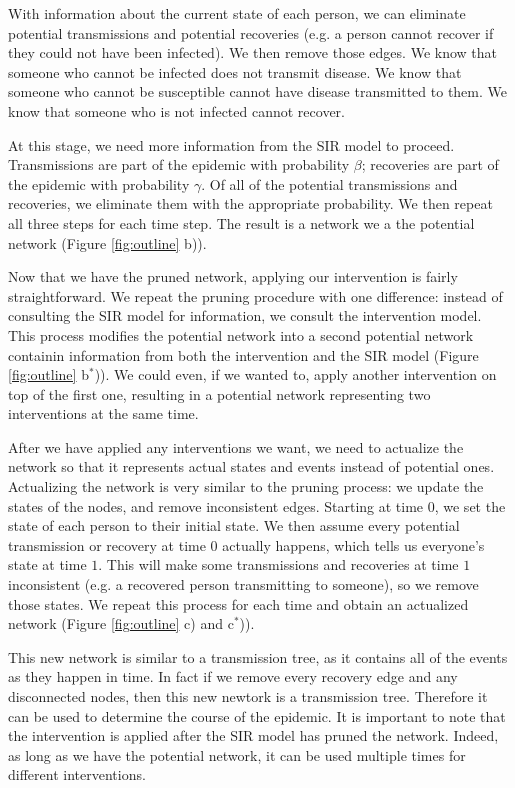 \documentclass[PTRSB]{rsos}
\begin{document}
\begin{multicols}{2}
With information about the current state of each person, we can eliminate potential transmissions and potential recoveries (e.g. a person cannot recover if they could not have been infected).
We then remove those edges.
We know that someone who cannot be infected does not transmit disease.
We know that someone who cannot be susceptible cannot have disease transmitted to them.
We know that someone who is not infected cannot recover.

At this stage, we need more information from the SIR model to proceed.
Transmissions are part of the epidemic with probability $\beta$; recoveries are part of the epidemic with probability $\gamma$.
Of all of the potential transmissions and recoveries, we eliminate them with the appropriate probability.
We then repeat all three steps for each time step.
The result is a network we a the potential network (Figure \ref{fig:outline} b)).

Now that we have the pruned network, applying our intervention is fairly straightforward.
We repeat the pruning procedure with one difference: instead of consulting the SIR model for information, we consult the intervention model.
This process modifies the potential network into a second potential network containin information from both the intervention and the SIR model (Figure \ref{fig:outline} b${}^*$)).
We could even, if we wanted to, apply another intervention on top of the first one, resulting in a potential network representing two interventions at the same time.

After we have applied any interventions we want, we need to actualize the network so that it represents actual states and events instead of potential ones.
Actualizing the network is very similar to the pruning process: we update the states of the nodes, and remove inconsistent edges.
Starting at time $0$, we set the state of each person to their initial state.
We then assume every potential transmission or recovery at time $0$ actually happens, which tells us everyone's state at time $1$.
This will make some transmissions and recoveries at time $1$ inconsistent (e.g. a recovered person transmitting to someone), so we remove those states.
We repeat this process for each time and obtain an actualized network (Figure \ref{fig:outline} c) and c${}^*$)).

This new network is similar to a transmission tree, as it contains all of the events as they happen in time.
In fact if we remove every recovery edge and any disconnected nodes, then this new newtork is a transmission tree.
Therefore it can be used to determine the course of the epidemic.
It is important to note that the intervention is applied after the SIR model has pruned the network.
Indeed, as long as we have the potential network, it can be used multiple times for different interventions.


\end{multicols}
\end{document}
